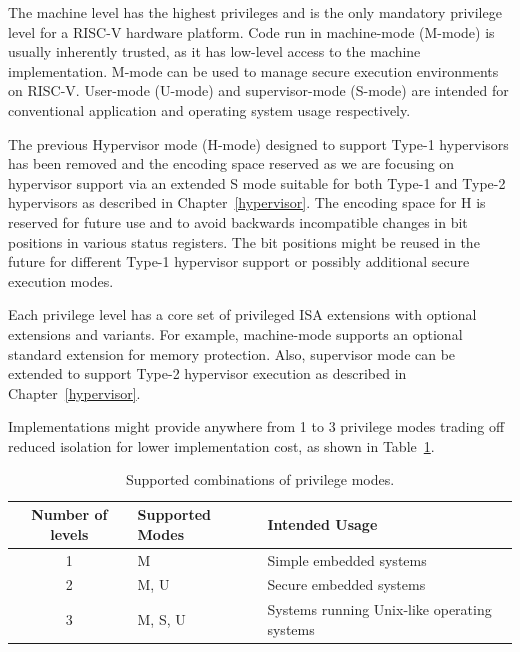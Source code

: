 The machine level has the highest privileges and is the only mandatory
privilege level for a RISC-V hardware platform.  Code run in
machine-mode (M-mode) is usually inherently trusted, as it has
low-level access to the machine implementation.  M-mode can be used to
manage secure execution environments on RISC-V.  User-mode (U-mode)
and supervisor-mode (S-mode) are intended for conventional application
and operating system usage respectively.

\begin{commentary}
The previous Hypervisor mode (H-mode) designed to support Type-1
hypervisors has been removed and the encoding space reserved as we are
focusing on hypervisor support via an extended S mode suitable for
both Type-1 and Type-2 hypervisors as described in
Chapter~\ref{hypervisor}.  The encoding space for H is reserved for
future use and to avoid backwards incompatible changes in bit
positions in various status registers.  The bit positions might be
reused in the future for different Type-1 hypervisor support or
possibly additional secure execution modes.
\end{commentary}

Each privilege level has a core set of privileged ISA extensions with optional
extensions and variants.  For example, machine-mode supports an optional
standard extension for memory protection.  Also, supervisor mode can be
extended to support Type-2 hypervisor execution as described in
Chapter~\ref{hypervisor}.

Implementations might provide anywhere from 1 to 3 privilege modes
trading off reduced isolation for lower implementation cost, as shown
in Table~\ref{privcombs}.

\begin{table}[h!]
\begin{center}
\begin{tabular}{|c|l|l|}
  \hline
   Number of levels &  Supported Modes & Intended Usage \\ \hline  
   1     & M          & Simple embedded systems \\ 
   2     & M, U       & Secure embedded systems \\ 
   3     & M, S, U    & Systems running Unix-like operating systems\\ 
  \hline
 \end{tabular}
\end{center}
\caption{Supported combinations of privilege modes.}
\label{privcombs}
\end{table}

